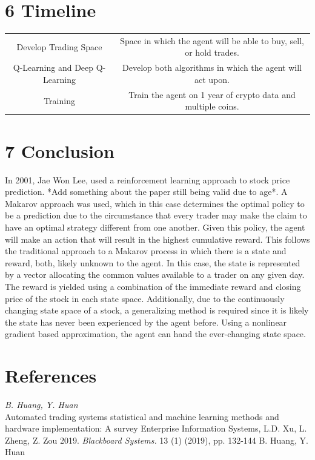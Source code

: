 \documentclass[letterpaper]{article}
\begin{document}
\section{6 Timeline}
\begin{center}
\begin{tabular}{ |c|c| } 
 \hline
 Develop Trading Space & Space in which the agent will be able to buy, sell, or hold trades. \\ 
 Q-Learning and Deep Q-Learning & Develop both algorithms in which the agent will act upon.\\ 
 Training & Train the agent on 1 year of crypto data and multiple coins. \\ 
 \hline
\end{tabular}
\end{center}

\section{7 Conclusion}
In 2001, Jae Won Lee, used a reinforcement learning approach to stock price prediction. *Add something about the paper still being valid due to age*. A Makarov approach was used, which in this case determines the optimal policy to be a prediction due to the circumstance that every trader may make the claim to have an optimal strategy different from one another. Given this policy, the agent will make an action that will result in the highest cumulative reward. This follows the traditional approach to a Makarov process in which there is a state and reward, both, likely unknown to the agent. In this case, the state is represented by a vector allocating the common values available to a trader on any given day. The reward is yielded using a combination of the immediate reward and closing price of the stock in each state space. Additionally, due to the continuously changing state space of a stock, a generalizing method is required since it is likely the state has never been experienced by the agent before. Using a nonlinear gradient based approximation, the agent can hand the ever-changing state space.

\section{References}
\smallskip \noindent \textit{B. Huang, Y. Huan}\\
Automated trading systems statistical and machine learning methods and hardware implementation: A survey Enterprise Information Systems, L.D. Xu, L. Zheng, Z. Zou 2019. \textit{Blackboard Systems.} 13 (1) (2019), pp. 132-144
B. Huang, Y. Huan
\end{document}
